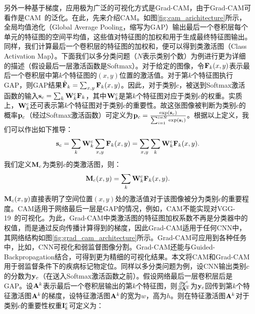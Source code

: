 另外一种基于梯度，应用极为广泛的可视化方式是Grad-CAM，由于Grad-CAM可看作是CAM~\cite{zhou2016learning}的泛化。在此，先来介绍CAM。如图\ref{fig:cam_arichitecture}所示，全局均值池化（Global Average Pooling，缩写为GAP）输出最后一个卷积层每个单元的特征图的空间平均值，这些值对特征图的加权和用于生成最终特征图输出。同样，我们计算最后一个卷积层的特征图的加权和，便可以得到类激活图（Class Activation Map）。下面我们以多分类问题（$N$表示类别个数）为例进行更为详细的描述（假设最后一层激活函数是Softmax）。对于给定的图像，令$\mathbf{F}_k(x, y)$表示最后一个卷积层中第$k$个特征图的$(x,y)$位置的激活值。对于第$k$个特征图执行GAP，则GAP结果$\hat{\mathbf{F}}_k=\sum_{x, y} \mathbf{F}_{k}(x,y)$。因此，对于类别$c$，被送到Softmax激活函数的输入$\mathbf{s}_c=\sum_{k} \mathbf{W}_{k}^{c} \mathbf{F}_{k}$，其中$\mathbf{W}_k^c$是第$k$个特征图对应于类别$c$的权重。实质上，$\mathbf{W}_{k}^{c}$还可表示第$k$个特征图对于类别$c$的重要性。故这张图像被判断为类别$c$的概率${\mathbf{p}}_c$（经过Softmax激活函数）可定义为$\mathbf{p}_c=\frac{\exp \left(\mathbf{s}_{c}\right)}{\sum_{i=1}^{i=N} \exp \left(\mathbf{s}_{i}\right)}$。根据以上定义，我们可以作出如下推导：
\begin{equation}
\mathbf{s}_{c}=\sum_{k} \mathbf{W}_{k}^{c} \sum_{x, y} \mathbf{F}_{k}(x, y)=\sum_{x, y} \sum_{k} \mathbf{W}_{k}^{c} \mathbf{F}_{k}(x, y).
\end{equation}
我们定义$\mathbf{M}_c$为类别$c$的类激活图，则：
\begin{equation}\label{equ:cam_heatmap_compute}
\mathbf{M}_{c}(x, y)=\sum_{k} \mathbf{W}_{k}^{c} \mathbf{F}_{k}(x, y).
\end{equation}
$\mathbf{M}_{c}(x, y)$直接表明了空间位置$(x,y)$处的激活值对于该图像被分为类别$c$的重要程度。CAM适用于网络最后一层是GAP的情况，例如，CAM不能实现对VGG-19~\cite{simonyan2014very}的可视化。为此，Grad-CAM中类激活图的特征图加权系数不再是分类器中的权值，而是通过反向传播计算得到的梯度，因此Grad-CAM适用于任何CNN中，其网络结构如图\ref{fig:grad_cam_architecture}所示。Grad-CAM可应用到各种任务中，比如，CNN可视化和弱监督图像分割。Grad-CAM还能与Guided-Backpropagation结合，可得到更为精细的可视化结果。本文将CAM和Grad-CAM用于弱监督条件下的疾病标记物定位。同样以多分类问题为例，设CNN输出类别$c$的分数为$\mathbf{y}_c$（在送入Softmax激活函数之前）。假设网络最后一层卷积层后是GAP。设$\mathbf{A}^{k}$表示最后一个卷积层输出的第$k$个特征图，则$\frac{\partial \mathbf{y}^{c}}{\partial \mathbf{A}^{k}}$为$\mathbf{y}_c$回传到第$k$个特征激活图$\mathbf{A}^{k}$的梯度，设特征激活图$\mathbf{A}^{k}$的宽为$w$，高为$h$。则在特征激活图$\mathbf{A}^{k}$对于类别$c$的重要性权重$\mathbf{I}_{k}^{c}$可定义为：
